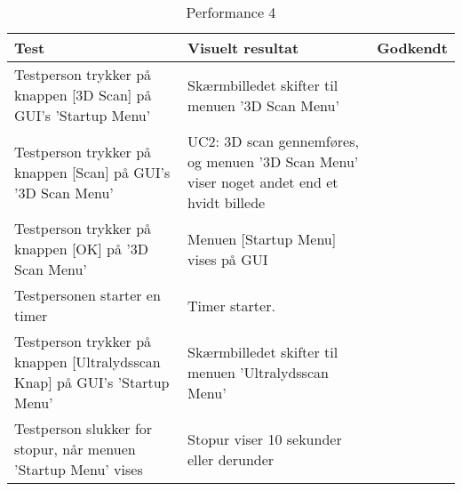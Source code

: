 \begin{table}[htb]
\begin{tabularx}{\textwidth}{|X|X|p{2cm}|}
\hline
\textbf{Test} & \textbf{Visuelt resultat} &\textbf{Godkendt}\\\hline
Testperson trykker på knappen [3D Scan] på GUI's 'Startup Menu' & Skærmbilledet skifter til menuen '3D Scan Menu' &  \\\hline
Testperson trykker på knappen [Scan] på GUI's '3D Scan Menu' & UC2: 3D scan gennemføres, og menuen '3D Scan Menu' viser noget andet end et hvidt billede & \\\hline
Testperson trykker på knappen [OK] på '3D Scan Menu' & Menuen [Startup Menu] vises på GUI & \\\hline
Testpersonen starter en timer & Timer starter. & \\\hline
Testperson trykker på knappen [Ultralydsscan Knap] på GUI's 'Startup Menu' & Skærmbilledet skifter til menuen 'Ultralydsscan Menu' & \\ \hline
Testperson slukker for stopur, når menuen 'Startup Menu' vises & Stopur viser 10 sekunder eller derunder & \\\hline
\end{tabularx} 
\caption{Performance 4}
\label{P4}
\end{table}
\newpage